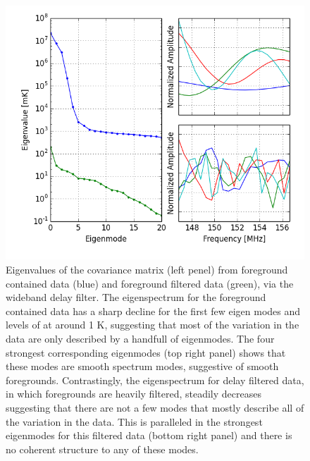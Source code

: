 \documentclass[twocolumn,numberedappendix]{emulateapj} \shorttitle{PSA64}
\begin{document}
\begin{figure}[t!]\centering
\includegraphics[width=1.5\columnwidth]{plots/eig.png}
\caption{Eigenvalues of the covariance matrix (left penel) from foreground
contained data (blue) and foreground filtered data (green), via the wideband
delay filter. The eigenspectrum for the foreground contained data has a sharp
decline for the first few eigen modes and levels of at around 1 K, suggesting
that most of the variation in the data are only described by a handfull of
eigenmodes. The four strongest corresponding eigenmodes (top right panel) shows
that these modes are smooth spectrum modes, suggestive of smooth foregrounds.
Contrastingly, the eigenspectrum for delay filtered data, in which foregrounds
are heavily filtered, steadily decreases suggesting that there are not a few
modes that mostly describe all of the variation in the data. This is paralleled
in the strongest eigenmodes for this filtered data (bottom right panel) and
there is no coherent structure to any of these modes. }
\label{fig:eigs}
\end{figure}
\end{document}
